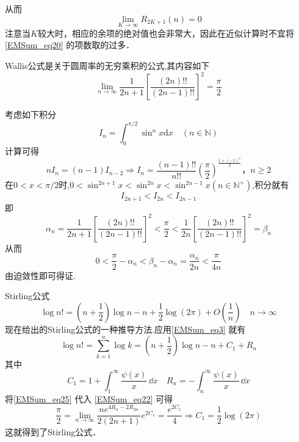 从而
\[
    \lim\limits_{K\to\infty}R_{2K+1}(n)=0	
\]
注意当$K$较大时，相应的余项的绝对值也会非常大，因此在近似计算时不宜将\autoref{EMSum_eq20} 的项数取的过多．
\begin{lemma}{}
Wallis公式是关于圆周率的无穷乘积的公式,其内容如下
		\begin{equation}\label{EMSum_eq22}
			\lim_{n\to\infty}\frac{1}{2n+1}\left[\frac{(2n)!!}{(2n-1)!!}\right]^2=\frac{\pi}{2}
		\end{equation}
\end{lemma}
考虑如下积分
\begin{equation}
    I_{n}=\int_{0}^{\pi/2}\sin^{n}x\mathrm{d}x\quad(n\in{\mathbb{N}})
\end{equation}
计算可得
\[
    nI_{n}=(n-1)I_{n-2}\Rightarrow I_{n}=\frac{(n-1)!!}{n!!}
    \left(\frac{\pi}{2}\right)^{\frac{1+(-1)^n}{2}}，n\geqslant2
\]
在$0<x<\pi/2$时,$0<\sin^{2n+1}x<\sin^{2n}x<\sin^{2n-1}x(n\in{\mathbb{N}^{+}})$,积分就有
\[
    I_{2n+1}<I_{2n}<I_{2n-1}
\]
即
\[
    \alpha_{n}=\frac{1}{2n+1}\left[\frac{(2n)!!}{(2n-1)!!}\right]^2<\frac{\pi}{2}<\frac{1}{2n}\left[\frac{(2n)!!}{(2n-1)!!}\right]^2=\beta_{n}
\]
从而
\[
    0<\frac{\pi}{2}-\alpha_{n}<\beta_{n}-\alpha_{n}=\frac{\alpha_{n}}{2n}<\frac{\pi}{4n}
\]
由迫敛性即可得证.
\begin{example}{Stirling公式}
\begin{equation}
    \log n!=\left(n+\frac{1}{2}\right)\log n-n+\frac{1}{2}\log(2\pi)
    +O\left(\frac{1}{n}\right)\quad n\to\infty
\end{equation}
现在给出的Stirling公式的一种推导方法.应用\autoref{EMSum_eq3} 就有
\begin{equation}\label{EMSum_eq25}
    \log n!=\sum_{k=1}^{n}\log k=\left(n+\frac{1}{2}\right)\log n-n+C_{1}+R_{n}
\end{equation}
其中
\[
    C_{1}=1+\int_{1}^{\infty}\frac{\psi(x)}{x}\,\dd x\quad
    R_{n}=-\int_{n}^{\infty}\frac{\psi(x)}{x}\,\dd x
\]
将\autoref{EMSum_eq25} 代入 \autoref{EMSum_eq22} 可得
\[
    \frac{\pi}{2}=\lim_{n\to\infty}\frac{ne^{4R_n-2R_{2n}}}{2(2n+1)}e^{2C_{1}}
    =\frac{e^{2C_{1}}}{4}\Rightarrow C_{1}=\frac{1}{2}\log(2\pi)
\]
这就得到了Stirling公式．
\end{example}
